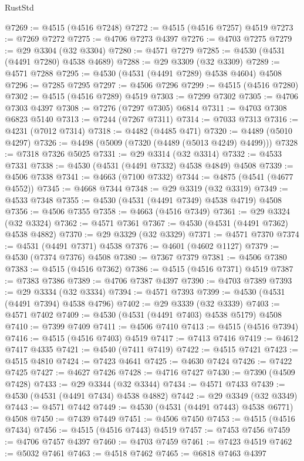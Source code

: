 \begin{lexlean}{RustStd}
\begin{coremodule}
@7269 := @4515 (@4516 @7248)
@7272 := @4515 (@4516 @7257) @4519
@7273 := @7269 @7272
@7275 := @4706 @7273 @4397
@7276 := @4703 @7275
@7279 := @29 @3304 (@32 @3304)
@7280 := @4571 @7279
@7285 := @4530 (@4531 (@4491 @7280) @4538 @4689)
@7288 := @29 @3309 (@32 @3309)
@7289 := @4571 @7288
@7295 := @4530 (@4531 (@4491 @7289) @4538 @4604) @4508
@7296 := @7285 @7295
@7297 := @4506 @7296
@7299 := @4515 (@4516 @7280)
@7302 := @4515 (@4516 @7289) @4519
@7303 := @7299 @7302
@7305 := @4706 @7303 @4397
@7308 := @7276 (@7297 @7305) @6814
@7311 := @4703 @7308 @6823 @5140
@7313 := @7244 (@7267 @7311)
@7314 := @7033 @7313
@7316 := @4231 (@7012 @7314)
@7318 := @4482 (@4485 @471)
@7320 := @4489 (@5010 @4297)
@7326 := @4498 (@5009 (@7320 (@4489 (@5013 @4249) @4499)))
@7328 := @7318 @7326 @5025
@7331 := @29 @3314 (@32 @3314)
@7332 := @4533 @7331
@7338 := @4530 (@4531 (@4491 @7332) @4538 @4849) @4508
@7339 := @4506 @7338
@7341 := @4663 (@7100 @7332)
@7344 := @4875 (@4541 (@4677 @4552))
@7345 := @4668 @7344
@7348 := @29 @3319 (@32 @3319)
@7349 := @4533 @7348
@7355 := @4530 (@4531 (@4491 @7349) @4538 @4719) @4508
@7356 := @4506 @7355
@7358 := @4663 (@4516 @7349)
@7361 := @29 @3324 (@32 @3324)
@7362 := @4571 @7361
@7367 := @4530 (@4531 (@4491 @7362) @4538 @4882)
@7370 := @29 @3329 (@32 @3329)
@7371 := @4571 @7370
@7374 := @4531 (@4491 @7371) @4538
@7376 := @4601 (@4602 @1127)
@7379 := @4530 (@7374 @7376) @4508
@7380 := @7367 @7379
@7381 := @4506 @7380
@7383 := @4515 (@4516 @7362)
@7386 := @4515 (@4516 @7371) @4519
@7387 := @7383 @7386
@7389 := @4706 @7387 @4397
@7390 := @4703 @7389
@7393 := @29 @3334 (@32 @3334)
@7394 := @4571 @7393
@7399 := @4530 (@4531 (@4491 @7394) @4538 @4796)
@7402 := @29 @3339 (@32 @3339)
@7403 := @4571 @7402
@7409 := @4530 (@4531 (@4491 @7403) @4538 @5179) @4508
@7410 := @7399 @7409
@7411 := @4506 @7410
@7413 := @4515 (@4516 @7394)
@7416 := @4515 (@4516 @7403) @4519
@7417 := @7413 @7416
@7419 := @4612 @7417 @4335
@7421 := @4540 (@7411 @7419)
@7422 := @4515 @7421
@7423 := @4515 @4810
@7424 := @7423 @4641
@7425 := @4630 @7424
@7426 := @7422 @7425
@7427 := @4627 @7426
@7428 := @4716 @7427
@7430 := @7390 (@4509 @7428)
@7433 := @29 @3344 (@32 @3344)
@7434 := @4571 @7433
@7439 := @4530 (@4531 (@4491 @7434) @4538 @4882)
@7442 := @29 @3349 (@32 @3349)
@7443 := @4571 @7442
@7449 := @4530 (@4531 (@4491 @7443) @4538 @6771) @4508
@7450 := @7439 @7449
@7451 := @4506 @7450
@7453 := @4515 (@4516 @7434)
@7456 := @4515 (@4516 @7443) @4519
@7457 := @7453 @7456
@7459 := @4706 @7457 @4397
@7460 := @4703 @7459
@7461 := @7423 @4519
@7462 := @5032 @7461
@7463 := @4518 @7462
@7465 := @6818 @7463 @4397

\end{coremodule}
\end{lexlean}

